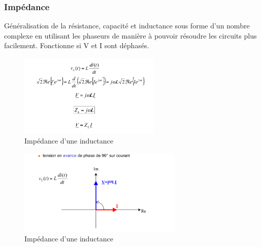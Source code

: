 \documentclass[a4paper]{article}
\begin{document}
        \subsubsection{Impédance}
            Généralisation de la résistance, capacité et inductance sous forme d'un nombre complexe en utilisant les phaseurs de manière à pouvoir résoudre les circuits plus facilement.
            Fonctionne si V et I sont déphasés.

            
            \begin{figure}[H]
                \begin{center}
                    \includegraphics[width=0.6\textwidth]{fig/2_impedance_L1.png}
                    \caption{Impédance d'une inductance}
                    \label{fig:2_superposition}
                \end{center}
            \end{figure}
            
            \begin{figure}[H]
                \begin{center}
                    \includegraphics[width=0.7\textwidth]{fig/2_impedance_L2.png}
                    \caption{Impédance d'une inductance}
                    \label{fig:2_superposition}
                \end{center}
            \end{figure}
\end{document}
